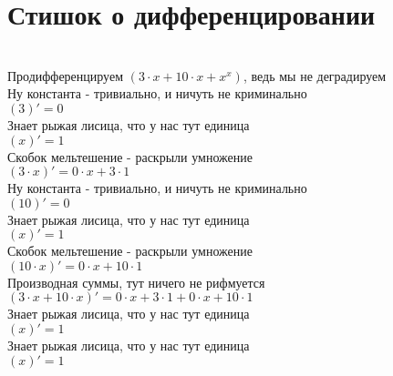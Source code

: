 \documentclass[a4paper,12pt]{article}
\begin{document}
\section*{Стишок о дифференцировании}\\
Продифференцируем $(3 \cdot x + 10 \cdot x + x ^{x} )$, ведь мы не деградируем\\
Ну константа - тривиально, и ничуть не криминально\\
\begin{math}
	(3)' = 0
\end{math}\\
Знает рыжая лисица, что у нас тут единица\\
\begin{math}
	(x)' = 1
\end{math}\\
Скобок мельтешение - раскрыли умножение\\
\begin{math}
	(3 \cdot x)' = 0 \cdot x + 3 \cdot 1
\end{math}\\
Ну константа - тривиально, и ничуть не криминально\\
\begin{math}
	(10)' = 0
\end{math}\\
Знает рыжая лисица, что у нас тут единица\\
\begin{math}
	(x)' = 1
\end{math}\\
Скобок мельтешение - раскрыли умножение\\
\begin{math}
	(10 \cdot x)' = 0 \cdot x + 10 \cdot 1
\end{math}\\
Производная суммы, тут ничего не рифмуется\\
\begin{math}
	(3 \cdot x + 10 \cdot x)' = 0 \cdot x + 3 \cdot 1 + 0 \cdot x + 10 \cdot 1
\end{math}\\
Знает рыжая лисица, что у нас тут единица\\
\begin{math}
	(x)' = 1
\end{math}\\
Знает рыжая лисица, что у нас тут единица\\
\begin{math}
	(x)' = 1
\end{math}\\
\end{document}
